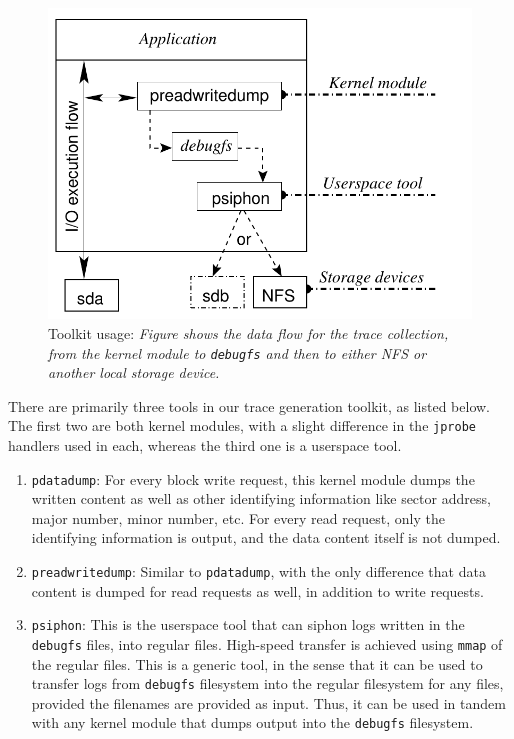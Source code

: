 
\begin{figure}[t]
    \centering
    \includegraphics[scale=0.8]{tracingchap-figures/toolkit-usability.pdf}
    \caption{Toolkit usage: \textit{Figure shows the data flow
			for the trace collection, from the kernel module to \texttt{debugfs}
		and then to either NFS or another local storage device.}}
    \label{fig:toolkit-usability}
\end{figure}

There are primarily three tools in our trace generation toolkit, as listed
below. The first two are both kernel modules, with a slight difference 
in the \texttt{jprobe} handlers used in each, whereas the third one is
a userspace tool.
\begin{enumerate}
	\item \texttt{pdatadump}: For every block write request, this kernel
		module dumps the written content as well as other identifying 
		information like sector address, major number, minor number, etc.
		For every read request, only the identifying information is 
		output, and the data content itself is not dumped.
	\item \texttt{preadwritedump}: Similar to \texttt{pdatadump}, with the
		only difference that data content is dumped for read requests as 
		well, in addition to write requests.
	\item \texttt{psiphon}: This is the userspace tool that can siphon 
		logs written in the \texttt{debugfs} files, into regular files.
		High-speed transfer is achieved using \texttt{mmap} of the
		regular files. This is a generic tool, in the sense that it can 
		be used to transfer logs from \texttt{debugfs} filesystem into
		the regular filesystem for any files, provided the filenames 
		are provided as input. Thus, it can be used in tandem with any
		kernel module that dumps output into the \texttt{debugfs} filesystem.
\end{enumerate}

